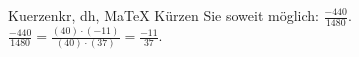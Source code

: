 \begin{MAufgabe}{Kuerzen}{kr, dh, MaTeX}
K\"urzen Sie soweit m\"oglich: $\frac{-440}{1480}$.\\ 
\ifLsg\MLoesung
\quad $\frac{-440}{1480}=\frac{(40)\cdot(-11)}{(40)\cdot(37)}=\frac{-11}{37}$.\else\relax\fi
 \end{MAufgabe}
